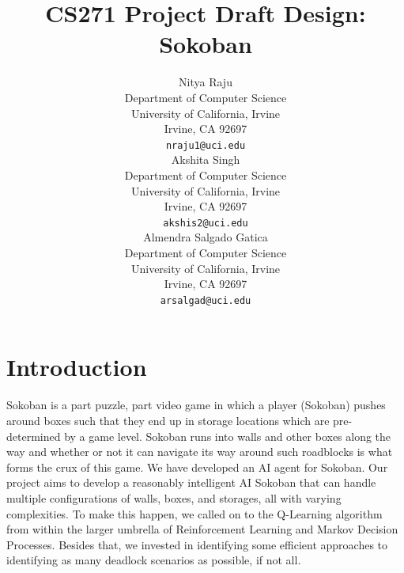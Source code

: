 \documentclass{article}
\title{CS271 Project Draft Design: Sokoban}
\author{
  Nitya Raju\\
  Department of Computer Science\\
  University of California, Irvine\\
  Irvine, CA 92697\\
  \texttt{nraju1@uci.edu} \\
   \And
  Akshita Singh \\
  Department of Computer Science\\
  University of California, Irvine\\
  Irvine, CA 92697\\
  \texttt{akshis2@uci.edu} \\
   \And
  Almendra Salgado Gatica \\
  Department of Computer Science\\
  University of California, Irvine\\
  Irvine, CA 92697\\
  \texttt{arsalgad@uci.edu} \\
}
\begin{document}
\maketitle

    

\section{Introduction}

Sokoban is a part puzzle, part video game in which a player (Sokoban) pushes around boxes such that they end up in storage locations which are pre-determined by a game level. Sokoban runs into walls and other boxes along the way and whether or not it can navigate its way around such roadblocks is what forms the crux of this game. We have developed an AI agent for Sokoban. Our project aims to develop a reasonably intelligent AI Sokoban that can handle multiple configurations of walls, boxes, and storages, all with varying complexities. To make this happen, we called on to the Q-Learning algorithm from within the larger umbrella of Reinforcement Learning and Markov Decision Processes. Besides that, we invested in identifying some efficient approaches to identifying as many deadlock scenarios as possible, if not all. 



\end{document}

